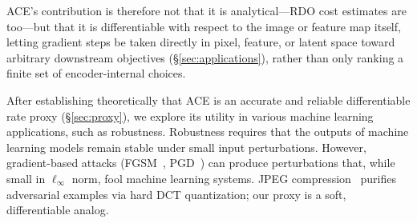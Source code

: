 ACE's contribution is therefore not that it is analytical---RDO cost estimates are too---but that it is differentiable with respect to the image or feature map itself, letting gradient steps be taken directly in pixel, feature, or latent space toward arbitrary downstream objectives (\S\ref{sec:applications}), rather than only ranking a finite set of encoder-internal choices.

After establishing theoretically that ACE is an accurate and reliable differentiable rate proxy (\S \ref{sec:proxy}), we explore its utility in various machine learning applications, such as robustness.
Robustness requires that the outputs of machine learning models remain stable under small input perturbations.
However, gradient-based attacks (FGSM~\citep{goodfellow2014explaining}, PGD~\citep{madry2017towards}) can produce perturbations that, while small in $\ell_\infty$ norm, fool machine learning systems.
JPEG compression~\citep{guo2018countering} purifies adversarial examples via hard DCT quantization; our proxy is a soft, differentiable analog.